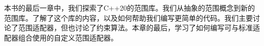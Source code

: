 本书的最后一章中，我们探索了C++20的范围库。我们从抽象的范围概念到新的范围库。了解了这个库的内容，以及如何帮助我们编写更简单的代码。我们主要讨论了范围适配器，但也讨论了约束算法。本章的最后，学习了如何编写可与标准适配器组合使用的自定义范围适配器。